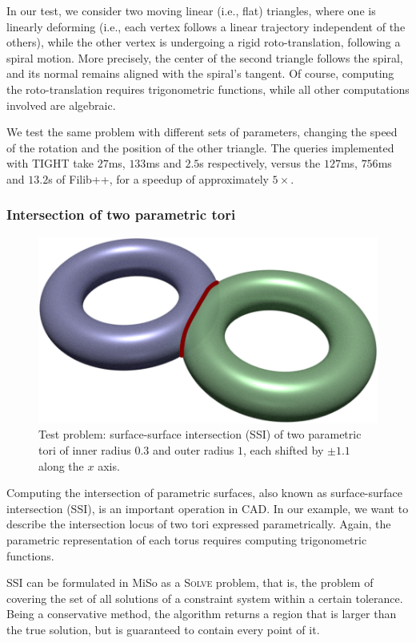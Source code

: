 In our test, we consider two moving linear (i.e., flat) triangles, where one is linearly deforming (i.e., each vertex follows a linear trajectory independent of the others), while the other vertex is undergoing a rigid roto-translation, following a spiral motion.
More precisely, the center of the second triangle follows the spiral, and its normal remains aligned with the spiral's tangent. 
Of course, computing the roto-translation requires trigonometric functions, while all other computations involved are algebraic.

We test the same problem with different sets of parameters, changing the speed of the rotation and the position of the other triangle. The queries implemented with TIGHT take $27$ms, $133$ms and $2.5$s respectively, versus the $127$ms, $756$ms and $13.2$s of Filib++, for a speedup of approximately $5\times$.

\subsubsection{Intersection of two parametric tori}
\begin{figure}
	\centering
	\includegraphics[width=0.8\linewidth]{fig/torusInt.png}
	\caption{Test problem: surface-surface intersection (SSI) of two parametric tori of inner radius $0.3$ and outer radius $1$, each shifted by $\pm1.1$ along the $x$ axis.}
	\label{fig:tori}
\end{figure}
Computing the intersection of parametric surfaces, also known as surface-surface intersection (SSI), is an important operation in CAD.
In our example, we want to describe the intersection locus of two tori expressed parametrically.
Again, the parametric representation of each torus requires computing trigonometric functions.

SSI can be formulated in MiSo as a \textsc{Solve} problem, that is, the problem of covering the set of all solutions of a constraint system within a certain tolerance.
Being a conservative method, the algorithm returns a region that is larger than the true solution, but is guaranteed to contain every point of it.


